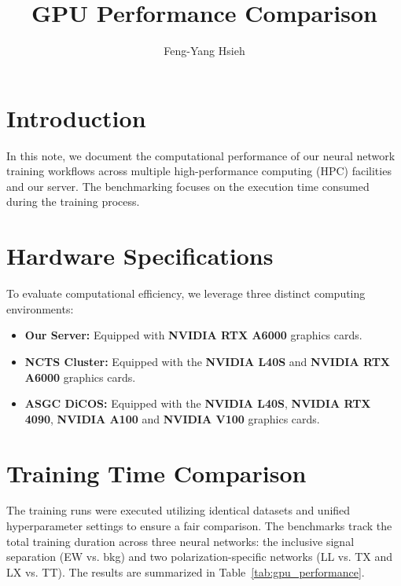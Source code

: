 \documentclass[12pt]{article}
\title{GPU Performance Comparison}
\author{Feng-Yang Hsieh}
\date{}
\begin{document}
\maketitle


\section{Introduction}%
\label{sec:introduction}

    In this note, we document the computational performance of our neural network training workflows across multiple high-performance computing (HPC) facilities and our server. The benchmarking focuses on the execution time consumed during the training process.


\section{Hardware Specifications}%
\label{sec:hardware_specifications}

    To evaluate computational efficiency, we leverage three distinct computing environments:
    \begin{itemize}
        \item \textbf{Our Server:} Equipped with \textbf{NVIDIA RTX A6000} graphics cards.
        \item \textbf{NCTS Cluster:} Equipped with the \textbf{NVIDIA L40S} and \textbf{NVIDIA RTX A6000} graphics cards.
        \item \textbf{ASGC DiCOS:} Equipped with the \textbf{NVIDIA L40S}, \textbf{NVIDIA RTX 4090}, \textbf{NVIDIA A100} and \textbf{NVIDIA V100} graphics cards.
    \end{itemize}


\section{Training Time Comparison}%
\label{sec:training_time_comparison}

    The training runs were executed utilizing identical datasets and unified hyperparameter settings to ensure a fair comparison. The benchmarks track the total training duration across three neural networks: the inclusive signal separation (EW vs. bkg) and two polarization-specific networks (LL vs. TX and LX vs. TT). The results are summarized in Table~\ref{tab:gpu_performance}.
\end{document}
